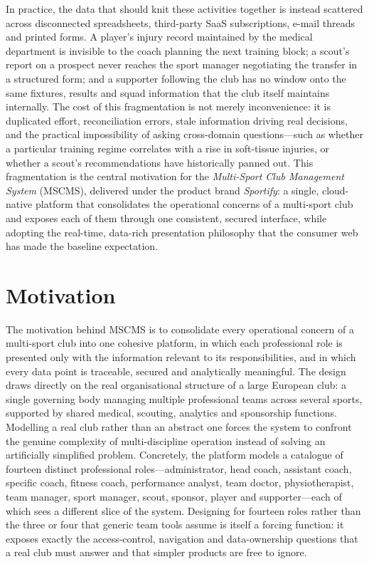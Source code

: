 In practice, the data that should knit these activities together is instead scattered across
disconnected spreadsheets, third-party SaaS subscriptions, e-mail threads and printed
forms. A player's injury record maintained by the medical department is invisible to the
coach planning the next training block; a scout's report on a prospect never reaches the
sport manager negotiating the transfer in a structured form; and a supporter following the
club has no window onto the same fixtures, results and squad information that the club
itself maintains internally. The cost of this fragmentation is not merely inconvenience: it is
duplicated effort, reconciliation errors, stale information driving real decisions, and the
practical impossibility of asking cross-domain questions---such as whether a particular
training regime correlates with a rise in soft-tissue injuries, or whether a scout's
recommendations have historically panned out. This fragmentation is the central motivation
for the \emph{Multi-Sport Club Management System} (MSCMS), delivered under the product
brand \emph{Sportify}: a single, cloud-native platform that consolidates the operational
concerns of a multi-sport club and exposes each of them through one consistent, secured
interface, while adopting the real-time, data-rich presentation philosophy that the
consumer web has made the baseline expectation.

\section{Motivation}
\label{sec:motivation}

The motivation behind MSCMS is to consolidate every operational concern of a multi-sport
club into one cohesive platform, in which each professional role is presented only with the
information relevant to its responsibilities, and in which every data point is traceable,
secured and analytically meaningful. The design draws directly on the real organisational
structure of a large European club: a single governing body managing multiple professional
teams across several sports, supported by shared medical, scouting, analytics and
sponsorship functions. Modelling a real club rather than an abstract one forces the system
to confront the genuine complexity of multi-discipline operation instead of solving an
artificially simplified problem. Concretely, the platform models a catalogue of fourteen
distinct professional roles---administrator, head coach, assistant coach, specific coach,
fitness coach, performance analyst, team doctor, physiotherapist, team manager, sport
manager, scout, sponsor, player and supporter---each of which sees a different slice of the
system. Designing for fourteen roles rather than the three or four that generic team tools
assume is itself a forcing function: it exposes exactly the access-control, navigation and
data-ownership questions that a real club must answer and that simpler products are free to
ignore.


